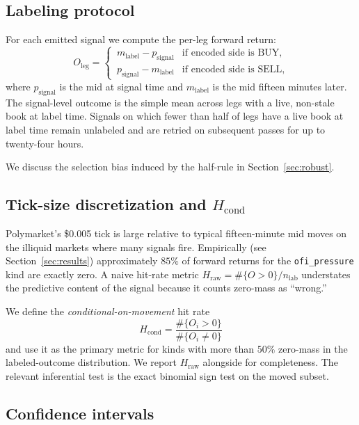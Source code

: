 \documentclass[review,12pt,authoryear]{elsarticle}
\begin{document}
\subsection{Labeling protocol}

For each emitted signal we compute the per-leg forward return:
\begin{equation}
O_\text{leg} =
\begin{cases}
\,m_\text{label} - p_\text{signal} & \text{if encoded side is BUY,} \\
\,p_\text{signal} - m_\text{label} & \text{if encoded side is SELL,}
\end{cases}
\end{equation}
where \(p_\text{signal}\) is the mid at signal time and \(m_\text{label}\) is
the mid fifteen minutes later. The signal-level outcome is the simple mean
across legs with a live, non-stale book at label time. Signals on which
fewer than half of legs have a live book at label time remain unlabeled and
are retried on subsequent passes for up to twenty-four hours.

We discuss the selection bias induced by the half-rule in
Section~\ref{sec:robust}.

\subsection{Tick-size discretization and \(H_\text{cond}\)}

Polymarket's \$0.005 tick is large relative to typical fifteen-minute mid
moves on the illiquid markets where many signals fire. Empirically (see
Section~\ref{sec:results}) approximately \(85\%\) of forward returns
for the \texttt{ofi\_pressure} kind are exactly zero. A naive hit-rate
metric \(H_\text{raw} = \#\{O > 0\} / n_\text{lab}\) understates the
predictive content of the signal because it counts zero-mass as ``wrong.''

We define the \emph{conditional-on-movement} hit rate
\begin{equation}
H_\text{cond} = \frac{\#\{O_i > 0\}}{\#\{O_i \neq 0\}}
\end{equation}
and use it as the primary metric for kinds with more than \(50\%\)
zero-mass in the labeled-outcome distribution. We report \(H_\text{raw}\)
alongside for completeness. The relevant inferential test is the exact
binomial sign test on the moved subset.

\subsection{Confidence intervals}
\end{document}
